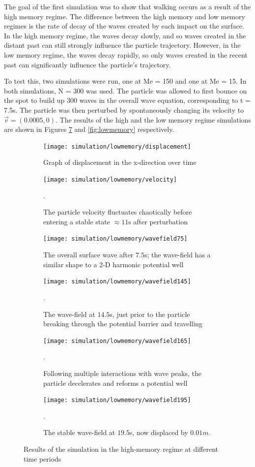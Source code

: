 The goal of the first simulation was to show that walking occurs as a result of the high memory regime. The difference between the high memory and low memory regimes is the rate of decay of the waves created by each impact on the surface. In the high memory regime, the waves decay slowly, and so waves created in the distant past can still strongly influence the particle trajectory. However, in the low memory regime, the waves decay rapidly, so only waves created in the recent past can significantly influence the particle's trajectory.

To test this, two simulations were run, one at Me = 150 and one at Me = 15. In both simulations, N = 300 was used. The particle was allowed to first bounce on the spot to build up 300 waves in the overall wave equation, corresponding to t = 7.5s. The particle was then perturbed by spontaneously changing its velocity to $\vec{v} = (0.0005,0)$. The results of the high and the low memory regime simulations are shown in Figures \ref{fig:highmemory} and \ref{fig:lowmemory} respectively.

\begin{figure}
	\centering
	\begin{subfigure}{0.4\textwidth}
		\texttt{[image: simulation/lowmemory/displacement]}
		\caption{Graph of displacement in the x-direction over time}
		\label{fig:lowmem:displacement}
	\end{subfigure}
	\hfill
	\begin{subfigure}{0.4\textwidth}
		\texttt{[image: simulation/lowmemory/velocity]}
		\caption{The particle velocity fluctuates chaotically before entering a stable state $\approx 11$s after perturbation}
		\label{fig:lowmem:velocity}.
	\end{subfigure}
	\begin{subfigure}{0.4\textwidth}
		\texttt{[image: simulation/lowmemory/wavefield75]}
		\caption{The overall surface wave after $7.5$s; the wave-field has a similar shape to a 2-D harmonic potential well}
		\label{fig:lowmem:wavefield75}
	\end{subfigure}
	\hfill
	\begin{subfigure}{0.4\textwidth}
		\texttt{[image: simulation/lowmemory/wavefield145]}
		\caption{The wave-field at $14.5$s, just prior to the particle breaking through the potential barrier and travelling}
		\label{fig:lowmem:wavefield145}.
	\end{subfigure}
	\begin{subfigure}{0.4\textwidth}
		\texttt{[image: simulation/lowmemory/wavefield165]}
		\caption{Following multiple interactions with wave peaks, the particle decelerates and reforms a potential well}
		\label{fig:lowmem:wavefield165}.
	\end{subfigure}
	\hfill
	\begin{subfigure}{0.4\textwidth}
		\texttt{[image: simulation/lowmemory/wavefield195]}
		\caption{The stable wave-field at $19.5$s, now displaced by $0.01m$.}
		\label{fig:lowmem:wavefield195}.
	\end{subfigure}
\caption{Results of the simulation in the high-memory regime at different time periods}
\label{fig:highmemory}
\end{figure}

